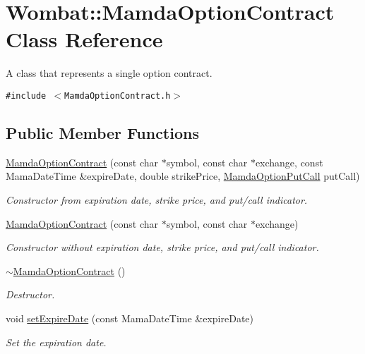 \hypertarget{classWombat_1_1MamdaOptionContract}{
\section{Wombat::Mamda\-Option\-Contract Class Reference}
\label{classWombat_1_1MamdaOptionContract}
}
A class that represents a single option contract.  


{\tt \#include $<$Mamda\-Option\-Contract.h$>$}

\subsection*{Public Member Functions}
\begin{CompactItemize}
\item 
\hyperlink{classWombat_1_1MamdaOptionContract_9cfb4ec903737947e308c029c7f7d081}{Mamda\-Option\-Contract} (const char $\ast$symbol, const char $\ast$exchange, const Mama\-Date\-Time \&expire\-Date, double strike\-Price, \hyperlink{namespaceWombat_ceb2ef77ec6c36b48ef57d2887d6ac49}{Mamda\-Option\-Put\-Call} put\-Call)
\begin{CompactList}\small\item\em Constructor from expiration date, strike price, and put/call indicator. \item\end{CompactList}\item 
\hyperlink{classWombat_1_1MamdaOptionContract_ad227199b28a941463a0f25aeae70117}{Mamda\-Option\-Contract} (const char $\ast$symbol, const char $\ast$exchange)
\begin{CompactList}\small\item\em Constructor without expiration date, strike price, and put/call indicator. \item\end{CompactList}\item 
\hyperlink{classWombat_1_1MamdaOptionContract_e65375537ef11b3425443ded04c35613}{$\sim$Mamda\-Option\-Contract} ()
\begin{CompactList}\small\item\em Destructor. \item\end{CompactList}\item 
void \hyperlink{classWombat_1_1MamdaOptionContract_7d67a88fb7eda7351dd80ae12ba63735}{set\-Expire\-Date} (const Mama\-Date\-Time \&expire\-Date)
\begin{CompactList}\small\item\em Set the expiration date. \item\end{CompactList}\item 

\end{CompactItemize}
